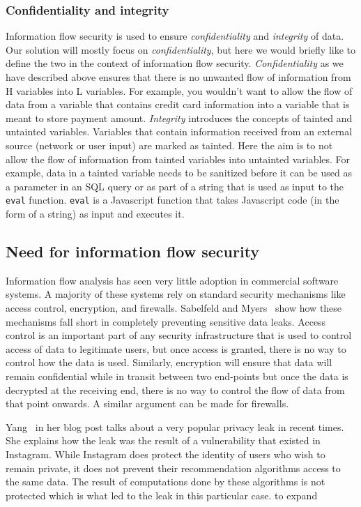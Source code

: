 \subsubsection{Confidentiality and integrity}
Information flow security is used to ensure \textit{confidentiality} and \textit{integrity}
of data. Our solution will mostly focus on \textit{confidentiality}, but here we would
briefly like to define the two in the context of information flow security.
\textit{Confidentiality} as we have described above ensures that there is no unwanted
flow of information from H variables into L variables. For example, you wouldn't
want to allow the flow of data from a variable that contains credit card information
into a variable that is meant to store payment amount. \textit{Integrity} introduces
the concepts of tainted and untainted variables. Variables that contain information
received from an external source (network or user input) are marked as tainted. Here
the aim is to not allow the flow of information from tainted variables into untainted
variables. For example, data in a tainted variable needs to be sanitized before it
can be used as a parameter in an SQL query or as part of a string that is used as
input to the \texttt{eval} function. \texttt{eval} is a Javascript function that
takes Javascript code (in the form of a string) as input and executes it.

\subsection{Need for information flow security}
Information flow analysis has seen very little adoption in commercial software systems.
A majority of these systems rely on standard security mechanisms like access control,
encryption, and firewalls. Sabelfeld and Myers~\cite{LangInfo} show how these mechanisms
fall short in completely preventing sensitive data leaks. Access control is an
important part of any security infrastructure that is used to control access of
data to legitimate users, but once access is granted, there is no way to control
how the data is used. Similarly, encryption will ensure that data will remain
confidential while in transit between two end-points but once the data is decrypted
at the receiving end, there is no way to control the flow of data from that point
onwards. A similar argument can be made for firewalls.

Yang~\cite{comey} in her blog post talks about a very popular privacy leak in recent
times. She explains how the leak was the result of a vulnerability that existed in
Instagram. While Instagram does protect the identity of users who wish to remain
private, it does not prevent their recommendation algorithms access to the same
data. The result of computations done by these algorithms is not protected which
is what led to the leak in this particular case. \remember to expand


